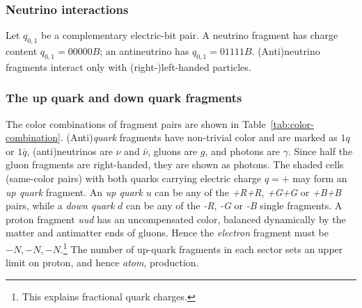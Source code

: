 \documentclass{ijuc}
\begin{document}
\subsubsection{Neutrino interactions}
Let $q_{0,1}$ be a complementary electric-bit pair. A neutrino fragment has charge content $q_{0,1}=00000B$; an antineutrino has $q_{0,1}=01111B$. (Anti)neutrino fragments interact only with (right-)left-handed particles.
\subsubsection{The up quark and down quark fragments}
The color combinations of fragment pairs are shown in Table~\ref{tab:color-combination}.
(Anti)\emph{quark} fragments have non-trivial color and are marked as $1q$ or $1\bar{q}$, (anti)neutrinos are $\nu$ and $\bar{\nu}$, gluons are $g$, and photons are $\gamma$.
Since half the gluon fragments are right-handed, they are shown as photons.
The shaded cells (same-color pairs) with both quarks carrying electric charge $q=+$ may form an \emph{up quark} fragment.
An \emph{up quark} $u$ can be any of the \emph{+R+R}, \emph{+G+G} or \emph{+B+B} pairs, while a \emph{down quark} $d$ can be any of the \emph{-R}, \emph{-G} or \emph{-B} single fragments. A proton fragment \emph{uud} has an uncompensated color, balanced dynamically by the matter and antimatter ends of gluons. Hence the \emph{electron} fragment must be $-N,-N,-N$.\footnote{This explains fractional quark charges.}
The number of up-quark fragments in each sector sets an upper limit on proton, and hence \textit{atom}, production.
\end{document}
